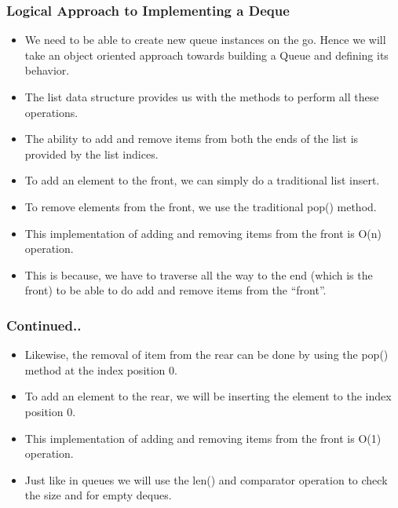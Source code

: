 \documentclass{beamer}
\begin{document}
\begin{frame}
\frametitle{Logical Approach to Implementing a Deque}
\begin{itemize}

\item We need to be able to create new queue instances on the go. Hence we will take an object oriented approach towards building a Queue and defining its behavior.

\item The list data structure provides us with the methods to perform all these operations.

\item The ability to add and remove items from both the ends of the list is provided by the list indices.

\item To add an element to the front, we can simply do a traditional list insert.

\item To remove elements from the front, we use the traditional pop() method.

\item This implementation of adding and removing items from the front is O(n) operation.

\item This is because, we have to traverse all the way to the end (which is the front) to be able to do add and remove items from the “front”.


\end{itemize}
\end{frame}


\begin{frame}
\frametitle{Continued..}
\begin{itemize}

\item Likewise, the removal of item from the rear can be done by using the pop() method at the index position 0.

\item To add an element to the rear, we will be inserting the element to the index position 0.

\item This implementation of adding and removing items from the front is O(1) operation.

\item Just like in queues we will use the len() and comparator operation to check the size and for empty deques.

\end{itemize}
\end{frame}
\end{document}
